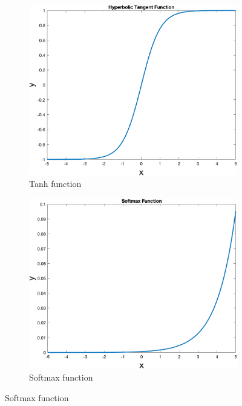 \begin{figure}
\begin{subfigure}[b]{0.4\textwidth}
        \label{fig:sigmoid}
    \end{subfigure}
    \begin{subfigure}[b]{0.4\textwidth}
        \includegraphics[width=\textwidth]{figures/tanh}
        \caption{Tanh function}
        \label{fig:tahn}
    \end{subfigure}
    \hspace{0.1\textwidth}
    \begin{subfigure}[b]{0.4\textwidth}
        \includegraphics[width=\textwidth]{figures/softmax}
        \caption{Softmax function}

\end{subfigure}
\end{figure}
